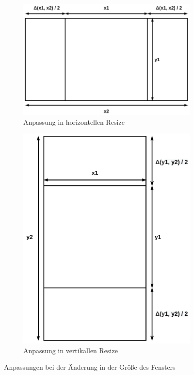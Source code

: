 \documentclass[doktyp=studarbeit]{TUBAFarbeiten}
\begin{document}
\begin{figure}[!htb]
    \centering
    \begin{subfigure}[b]{0.55\textwidth}
        \centering
        \includegraphics[width=1\linewidth]{display-2.png}
        \caption{Anpassung in horizontellen Resize}
    \end{subfigure}
    \begin{subfigure}[b]{0.4\textwidth}
        \centering
        \includegraphics[width=1\linewidth]{display-3.png}
        \caption{Anpassung in vertikallen Resize}
    \end{subfigure}
    \caption{Anpassungen bei der Änderung in der Größe des Fensters}
	\label{fig:display}
\end{figure}
\end{document}
